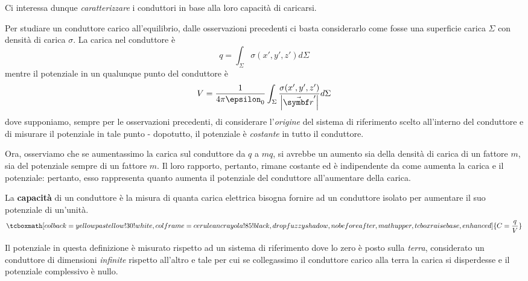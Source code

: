 Ci interessa dunque \textit{caratterizzare} i conduttori in base alla loro capacità di caricarsi.
\begin{observe}
	Per studiare un conduttore carico all'equilibrio, dalle osservazioni precedenti ci basta considerarlo come fosse una superficie carica $\Sigma$ con densità di carica $\sigma$. La carica nel conduttore è
	\begin{equation*}
		q=\int_{\Sigma}\sigma\left(x',y',z'\right)d\Sigma
	\end{equation*}
	mentre il potenziale in un qualunque punto del conduttore è
	\begin{equation*}
		V=\frac{1}{4\pi\epsilon_0}\int_{\Sigma}\frac{\sigma(x',y',z')}{\abs{\vba{r}'}}d\Sigma
	\end{equation*}
	dove supponiamo, sempre per le osservazioni precedenti, di considerare l'\textit{origine} del sistema di riferimento scelto all'interno del conduttore e di misurare il potenziale in tale punto - dopotutto, il potenziale è \textit{costante} in tutto il conduttore.
\end{observe}
Ora, osserviamo che se aumentassimo la carica sul conduttore da $q$ a $mq$, si avrebbe un aumento sia della densità di carica di un fattore $m$, sia del potenziale sempre di un fattore $m$. Il loro rapporto, pertanto, rimane costante ed è indipendente da come aumenta la carica e il potenziale: pertanto, esso rappresenta quanto aumenta il potenziale del conduttore all'aumentare della carica. 
\begin{define}
	La \textbf{capacità} di un conduttore è la misura di quanta carica elettrica bisogna fornire ad un conduttore isolato per aumentare il suo potenziale di un'unità.
	\begin{equation}
		\tcboxmath[colback=yellowpastellow!30!white,colframe=ceruleancrayola!85!black,drop fuzzy shadow, nobeforeafter, math upper, tcbox raise base, enhanced]{C=\frac{q}{V}}
	\end{equation}
\end{define}
Il potenziale in questa definizione è misurato rispetto ad un sistema di riferimento dove lo zero è posto sulla \textit{terra}, considerato un conduttore di dimensioni \textit{infinite} rispetto all'altro e tale per cui se collegassimo il conduttore carico alla terra la carica si disperdesse e il potenziale complessivo è nullo.

